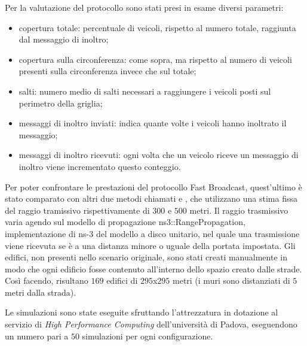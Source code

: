Per la valutazione del protocollo sono stati presi in esame diversi parametri:
\begin{itemize}
	\item copertura totale: percentuale di veicoli, rispetto al numero totale, raggiunta dal messaggio di inoltro;
	\item copertura sulla circonferenza: come sopra, ma rispetto al numero di veicoli presenti sulla circonferenza invece che sul totale;
	\item salti: numero medio di salti necessari a raggiungere i veicoli posti sul perimetro della griglia;
	\item messaggi di inoltro inviati: indica quante volte i veicoli hanno inoltrato il messaggio;
	\item messaggi di inoltro ricevuti: ogni volta che un veicolo riceve un messaggio di inoltro viene incrementato questo conteggio.
\end{itemize}
Per poter confrontare le prestazioni del protocollo Fast Broadcast, quest'ultimo è stato comparato con altri due metodi chiamati \statica e \staticb,
che utilizzano una stima fissa del raggio tramissivo rispettivamente di $300$ e $500$ metri.
Il raggio trasmissivo varia agendo sul modello di propagazione \textsf{ns3::RangePropagation},
implementazione di ns-3 del modello a disco unitario, nel quale una trasmissione viene ricevuta se è a una distanza minore o uguale della portata impostata.
Gli edifici, non presenti nello scenario originale, sono stati creati manualmente in modo che ogni edificio fosse contenuto all'interno dello spazio creato dalle strade.
Così facendo, risultano $169$ edifici di $295$x$295$ metri (i muri sono distanziati di $5$ metri dalla strada).

Le simulazioni sono state eseguite sfruttando l'attrezzatura in dotazione al servizio di \textit{High Performance Computing} dell'università di Padova,
eseguendono un numero pari a $50$ simulazioni per ogni configurazione.
%
%
